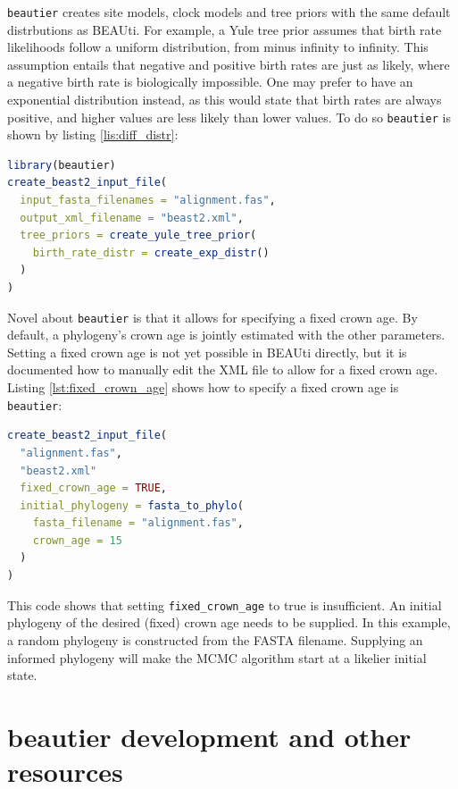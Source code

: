 \documentclass{article}
\begin{document}
\verb;beautier; creates site models, clock models and tree priors with the same default distrbutions as BEAUti.
For example, a Yule tree prior assumes that birth rate likelihoods follow a uniform distribution, from minus infinity
to infinity. This assumption entails that negative and positive birth rates are just as likely, where a negative birth rate is biologically impossible. 
One may prefer to have an exponential distribution instead, as this would state that birth rates are always positive, and
higher values are less likely than lower values. To do so \verb;beautier; is shown by listing \ref{lis:diff_distr}:


\begin{lstlisting}[language=R, caption=Example with Yule tree prior with different birth rate distribution, label=lst:diff_distr, floatplacement=H]
library(beautier)
create_beast2_input_file(
  input_fasta_filenames = "alignment.fas",
  output_xml_filename = "beast2.xml",
  tree_priors = create_yule_tree_prior(
    birth_rate_distr = create_exp_distr()    
  )
)
\end{lstlisting}

Novel about \verb;beautier; is that it allows for specifying a fixed crown age. 
By default, a phylogeny's crown age is jointly estimated with the other parameters.
Setting a fixed crown age is not yet possible in BEAUti directly, but it is documented how to 
manually edit the XML file to allow for a fixed crown age. Listing \ref{lst:fixed_crown_age} shows how to specify a fixed crown age is \verb;beautier;:

\begin{lstlisting}[language=R, caption=Example with fixed crown age, label=lst:fixed_crown_age, floatplacement=H]
create_beast2_input_file(
  "alignment.fas",
  "beast2.xml"
  fixed_crown_age = TRUE,
  initial_phylogeny = fasta_to_phylo(
    fasta_filename = "alignment.fas", 
    crown_age = 15
  )
)
\end{lstlisting}

This code shows that setting \verb;fixed_crown_age; to true is insufficient. An
initial phylogeny of the desired (fixed) crown age needs to be supplied. In this
example, a random phylogeny is constructed from the FASTA filename. Supplying an 
informed phylogeny will make the MCMC algorithm start at a likelier initial state.

\section{beautier development and other resources}
\end{document}
